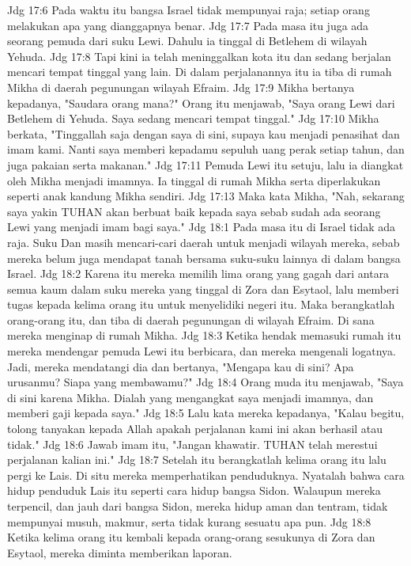 Jdg 17:6  Pada waktu itu bangsa Israel tidak mempunyai raja; setiap orang melakukan apa yang dianggapnya benar.
Jdg 17:7  Pada masa itu juga ada seorang pemuda dari suku Lewi. Dahulu ia tinggal di Betlehem di wilayah Yehuda.
Jdg 17:8  Tapi kini ia telah meninggalkan kota itu dan sedang berjalan mencari tempat tinggal yang lain. Di dalam perjalanannya itu ia tiba di rumah Mikha di daerah pegunungan wilayah Efraim.
Jdg 17:9  Mikha bertanya kepadanya, "Saudara orang mana?" Orang itu menjawab, "Saya orang Lewi dari Betlehem di Yehuda. Saya sedang mencari tempat tinggal."
Jdg 17:10  Mikha berkata, "Tinggallah saja dengan saya di sini, supaya kau menjadi penasihat dan imam kami. Nanti saya memberi kepadamu sepuluh uang perak setiap tahun, dan juga pakaian serta makanan."
Jdg 17:11  Pemuda Lewi itu setuju, lalu ia diangkat oleh Mikha menjadi imamnya. Ia tinggal di rumah Mikha serta diperlakukan seperti anak kandung Mikha sendiri.
Jdg 17:13  Maka kata Mikha, "Nah, sekarang saya yakin TUHAN akan berbuat baik kepada saya sebab sudah ada seorang Lewi yang menjadi imam bagi saya."
Jdg 18:1  Pada masa itu di Israel tidak ada raja. Suku Dan masih mencari-cari daerah untuk menjadi wilayah mereka, sebab mereka belum juga mendapat tanah bersama suku-suku lainnya di dalam bangsa Israel.
Jdg 18:2  Karena itu mereka memilih lima orang yang gagah dari antara semua kaum dalam suku mereka yang tinggal di Zora dan Esytaol, lalu memberi tugas kepada kelima orang itu untuk menyelidiki negeri itu. Maka berangkatlah orang-orang itu, dan tiba di daerah pegunungan di wilayah Efraim. Di sana mereka menginap di rumah Mikha.
Jdg 18:3  Ketika hendak memasuki rumah itu mereka mendengar pemuda Lewi itu berbicara, dan mereka mengenali logatnya. Jadi, mereka mendatangi dia dan bertanya, "Mengapa kau di sini? Apa urusanmu? Siapa yang membawamu?"
Jdg 18:4  Orang muda itu menjawab, "Saya di sini karena Mikha. Dialah yang mengangkat saya menjadi imamnya, dan memberi gaji kepada saya."
Jdg 18:5  Lalu kata mereka kepadanya, "Kalau begitu, tolong tanyakan kepada Allah apakah perjalanan kami ini akan berhasil atau tidak."
Jdg 18:6  Jawab imam itu, "Jangan khawatir. TUHAN telah merestui perjalanan kalian ini."
Jdg 18:7  Setelah itu berangkatlah kelima orang itu lalu pergi ke Lais. Di situ mereka memperhatikan penduduknya. Nyatalah bahwa cara hidup penduduk Lais itu seperti cara hidup bangsa Sidon. Walaupun mereka terpencil, dan jauh dari bangsa Sidon, mereka hidup aman dan tentram, tidak mempunyai musuh, makmur, serta tidak kurang sesuatu apa pun.
Jdg 18:8  Ketika kelima orang itu kembali kepada orang-orang sesukunya di Zora dan Esytaol, mereka diminta memberikan laporan.
